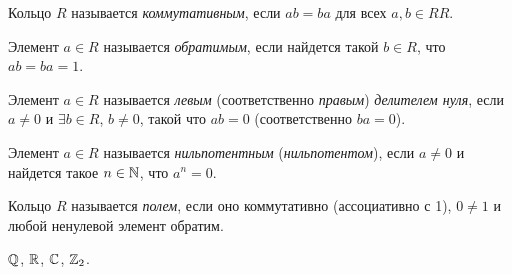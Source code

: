 \begin{definition}
    Кольцо $R$ называется \textit{коммутативным}, если $ab = ba$ для всех $a, b \in RR$.
\end{definition}

\begin{definition}
    Элемент $a \in R$ называется \textit{обратимым}, если найдется такой $b \in R$, что $ab = ba = 1$.
\end{definition}

\begin{comment}
    Все обратимые элементы кольца $R$ образуют группу по умножению.
\end{comment}

\begin{definition}
    Элемент $a \in R$ называется \textit{левым} (соответственно \textit{правым}) \textit{делителем нуля}, если $a \neq 0$ и $\exists b \in R$, $b \neq 0$, такой что $ab = 0$ (соответственно $ba = 0$).
\end{definition}

\begin{comment}
    Если $R$ коммутативно, то множества левых и правых делителей нуля совпадают. Тогда левые и правые делители нуля называются просто <<делителями нуля>>.
\end{comment}

\begin{comment}
    Все делители нуля в $R$ необратимы. Если $ab = 0$, $a \neq 0$, $b \neq 0$ и существует $a^{-1}$, то получаем $a^{-1} a b = a^{-1} 0$, откуда $b = 0$ --- противоречние.
\end{comment}

\begin{definition}
    Элемент $a \in R$ называется \textit{нильпотентным} (\textit{нильпотентом}), если $a \neq 0$ и найдется такое $n \in \mathbb{N}$, что $a^{n} = 0$.
\end{definition}

\begin{comment}
    Всякий нильпотент является делителем нуля: если $a \neq 0$ и $n$ минимально, то $a = a^{n - 1} = 0$.
\end{comment}

\begin{definition}
    Кольцо $R$ называется \textit{полем}, если оно коммутативно (ассоциативно с 1), $0 \neq 1$ и любой ненулевой элемент обратим.
\end{definition}

\begin{example}
    $\mathbb{Q}$, $\mathbb{R}$, $\mathbb{C}$, $\mathbb{Z}_2$.
\end{example}


